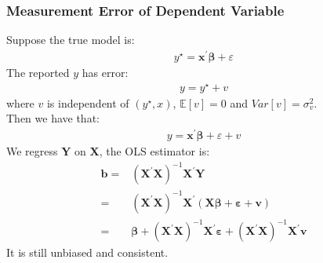 \documentclass{article}
\begin{document}
\subsubsection{Measurement Error of Dependent Variable}
Suppose the true model is:
	\begin{align*}
		y^\star = \boldsymbol{x}^\prime \boldsymbol{\beta} + \varepsilon
	\end{align*}
The reported $y$ has error:
	\begin{align*}
		y = y^\star + v
	\end{align*}
where $v$ is independent of $(y^\star, x)$, $\mathbb{E}[v] = 0$ and $Var[v] = \sigma^2_v$.\\
Then we have that:
	\begin{align*}
		y = \boldsymbol{x}^\prime \boldsymbol{\beta} + \varepsilon + v
	\end{align*}
We regress $\boldsymbol{Y}$ on $\boldsymbol{X}$, the OLS estimator is:
	\begin{align*}
		\boldsymbol{b} = &(\boldsymbol{X}^\prime \boldsymbol{X})^{-1} \boldsymbol{X}^\prime \boldsymbol{Y}\\ = &
		(\boldsymbol{X}^\prime \boldsymbol{X})^{-1} \boldsymbol{X}^\prime (\boldsymbol{X} \boldsymbol{\beta} + \boldsymbol{\varepsilon} + \boldsymbol{v})\\ = &
		\boldsymbol{\beta} + (\boldsymbol{X}^\prime \boldsymbol{X})^{-1} \boldsymbol{X}^\prime \boldsymbol{\varepsilon} + (\boldsymbol{X}^\prime \boldsymbol{X})^{-1} \boldsymbol{X}^\prime \boldsymbol{v}
	\end{align*}
It is still unbiased and consistent.
\end{document}

